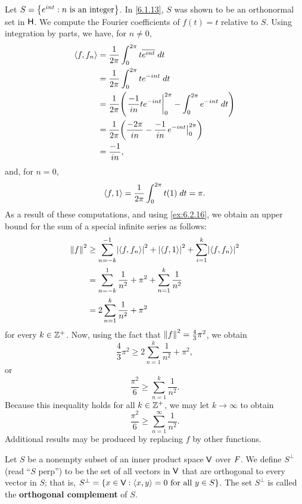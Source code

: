 \begin{eg}\label{6.2.8}
  Let \(S = \left\lbrace e^{int} : n \text{ is an integer}\right\rbrace\).
  In \cref{6.1.13}, \(S\) was shown to be an orthonormal set in \(\mathsf{H}\).
  We compute the Fourier coefficients of \(f(t) = t\) relative to \(S\).
  Using integration by parts, we have, for \(n \neq 0\),
  \begin{align*}
    \inn{f, f_n} & = \frac{1}{2 \pi} \int_0^{2 \pi} t \conj{e^{int}} \; dt                                          \\
                 & = \frac{1}{2 \pi} \int_0^{2 \pi} t e^{-int} \; dt                                                \\
                 & = \frac{1}{2 \pi} \pa{\eval{\frac{-1}{in} t e^{-int}}_0^{2 \pi} - \int_0^{2 \pi} e^{-int} \; dt} \\
                 & = \frac{1}{2 \pi} \pa{\frac{-2 \pi}{in} - \frac{-1}{in} \eval{e^{-int}}_0^{2 \pi}}               \\
                 & = \frac{-1}{in},
  \end{align*}
  and, for \(n = 0\),
  \[
    \left\langle f, 1\right\rangle = \frac{1}{2 \pi} \int_0^{2 \pi} t(1) \; dt = \pi.
  \]
  As a result of these computations, and using \cref{ex:6.2.16}, we obtain an upper bound for the sum of a special infinite series as follows:
  \begin{align*}
    \norm{f}^2 & \geq \sum_{n = -k}^{-1} \abs{\inn{f, f_n}}^2 + \abs{\inn{f, 1}}^2 + \sum_{i = 1}^k \abs{\inn{f, f_n}}^2 \\
               & = \sum_{n = -k}^1 \frac{1}{n^2} + \pi^2 + \sum_{n = 1}^k \frac{1}{n^2}                                  \\
               & = 2 \sum_{n = 1}^k \frac{1}{n^2} + \pi^2
  \end{align*}
  for every \(k \in \mathbb{Z}^+\).
  Now, using the fact that \(\left\lVert f\right\rVert^2 = \frac{4}{3} \pi^2\), we obtain
  \[
    \frac{4}{3} \pi^2 \geq 2 \sum_{n = 1}^k \frac{1}{n^2} + \pi^2,
  \]
  or
  \[
    \frac{\pi^2}{6} \geq \sum_{n = 1}^k \frac{1}{n^2}.
  \]
  Because this inequality holds for all \(k \in \mathbb{Z}^+\), we may let \(k \to \infty\) to obtain
  \[
    \frac{\pi^2}{6} \geq \sum_{n = 1}^\infty \frac{1}{n^2}.
  \]
  Additional results may be produced by replacing \(f\) by other functions.
\end{eg}

\begin{defn}\label{6.2.9}
  Let \(S\) be a nonempty subset of an inner product space \(\mathsf{V}\) over \(\mathit{F}\).
  We define \(S^{\perp}\) (read ``\(S\) perp'') to be the set of all vectors in \(\mathsf{V}\) that are orthogonal to every vector in \(S\);
  that is, \(S^{\perp} = \left\lbrace x \in \mathsf{V} : \left\langle x, y\right\rangle = 0 \text{ for all } y \in S\right\rbrace\).
  The set \(S^{\perp}\) is called the \textbf{orthogonal complement} of \(S\).
\end{defn}

